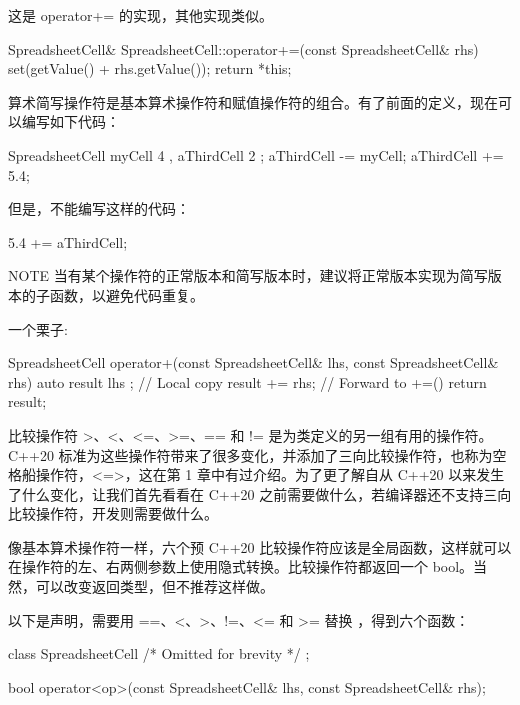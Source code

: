 这是 operator+= 的实现，其他实现类似。

\begin{cpp}
SpreadsheetCell& SpreadsheetCell::operator+=(const SpreadsheetCell& rhs)
{
    set(getValue() + rhs.getValue());
    return *this;
}
\end{cpp}

算术简写操作符是基本算术操作符和赋值操作符的组合。有了前面的定义，现在可以编写如下代码：

\begin{cpp}
SpreadsheetCell myCell { 4 }, aThirdCell { 2 };
aThirdCell -= myCell;
aThirdCell += 5.4;
\end{cpp}

但是，不能编写这样的代码：

\begin{cpp}
5.4 += aThirdCell;
\end{cpp}

\begin{myNotic}{NOTE}
当有某个操作符的正常版本和简写版本时，建议将正常版本实现为简写版本的子函数，以避免代码重复。
\end{myNotic}

一个栗子:

\begin{cpp}
SpreadsheetCell operator+(const SpreadsheetCell& lhs, const SpreadsheetCell& rhs)
{
    auto result { lhs }; // Local copy
    result += rhs; // Forward to +=()
    return result;
}
\end{cpp}


比较操作符 >、<、<=、>=、== 和 != 是为类定义的另一组有用的操作符。C++20 标准为这些操作符带来了很多变化，并添加了三向比较操作符，也称为空格船操作符，<=>，这在第 1 章中有过介绍。为了更了解自从 C++20 以来发生了什么变化，让我们首先看看在 C++20 之前需要做什么，若编译器还不支持三向比较操作符，开发则需要做什么。


像基本算术操作符一样，六个预 C++20 比较操作符应该是全局函数，这样就可以在操作符的左、右两侧参数上使用隐式转换。比较操作符都返回一个 bool。当然，可以改变返回类型，但不推荐这样做。

以下是声明，需要用 ==、<、>、!=、<= 和 >= 替换 ，得到六个函数：

\begin{cpp}
class SpreadsheetCell { /* Omitted for brevity */ };

bool operator<op>(const SpreadsheetCell& lhs, const SpreadsheetCell& rhs);
\end{cpp}


